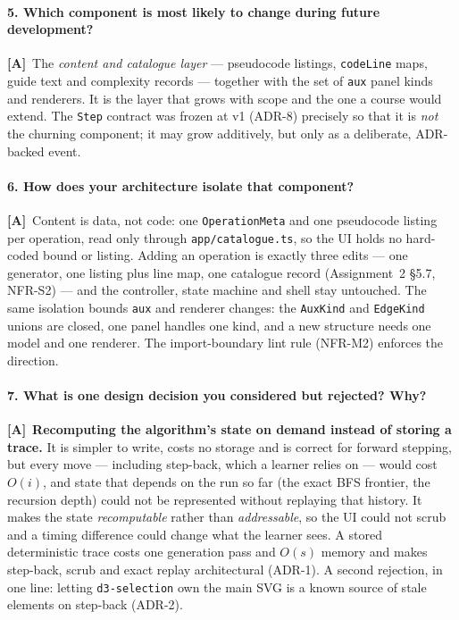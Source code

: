 \documentclass[11pt,a4paper]{article}
\newcommand{\A}{\textcolor{asmc}{\textbf{[A]}}}     %
\newcommand{\ct}[1]{\texttt{#1}}
\begin{document}
\paragraph{5. Which component is most likely to change during future development?}
\A\ The \emph{content and catalogue layer} --- pseudocode listings, \ct{codeLine} maps, guide
text and complexity records --- together with the set of \ct{aux} panel kinds and renderers. It
is the layer that grows with scope and the one a course would extend. The \ct{Step} contract was
frozen at v1 (ADR-8) precisely so that it is \emph{not} the churning component; it may grow
additively, but only as a deliberate, ADR-backed event.

\paragraph{6. How does your architecture isolate that component?}
\A\ Content is data, not code: one \ct{OperationMeta} and one pseudocode listing per operation,
read only through \ct{app/catalogue.ts}, so the UI holds no hard-coded bound or listing. Adding
an operation is exactly three edits --- one generator, one listing plus line map, one catalogue
record (Assignment~2 \S5.7, NFR-S2) --- and the controller, state machine and shell stay
untouched. The same isolation bounds \ct{aux} and renderer changes: the \ct{AuxKind} and
\ct{EdgeKind} unions are closed, one panel handles one kind, and a new structure needs one model
and one renderer. The import-boundary lint rule (NFR-M2) enforces the direction.

\paragraph{7. What is one design decision you considered but rejected? Why?}
\A\ \textbf{Recomputing the algorithm's state on demand instead of storing a trace.} It is
simpler to write, costs no storage and is correct for forward stepping, but every move ---
including step-back, which a learner relies on --- would cost $O(i)$, and state that depends on
the run so far (the exact BFS frontier, the recursion depth) could not be represented without
replaying that history. It makes the state \emph{recomputable} rather than \emph{addressable}, so
the UI could not scrub and a timing difference could change what the learner sees. A stored
deterministic trace costs one generation pass and $O(s)$ memory and makes step-back, scrub and
exact replay architectural (ADR-1). A second rejection, in one line: letting \ct{d3-selection}
own the main SVG is a known source of stale elements on step-back (ADR-2).
\end{document}
